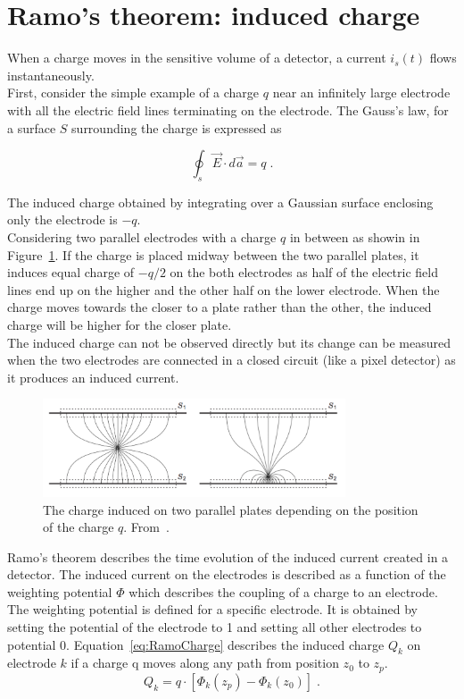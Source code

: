 \section{Ramo's theorem: induced charge}
When a charge moves in the sensitive volume of a detector, a current
$i_s(t)$ flows instantaneously. \\ 
First, consider the simple example of a charge $q$ near an infinitely
large electrode with all the electric field lines terminating on the
electrode. The Gauss's law, for a surface $S$ surrounding the charge
is expressed as

\begin{equation}
\oint_{s} \vec{E} \cdot d\vec{a}=q\; .
\label{eq:GaussLaw}
\end{equation}

The induced charge obtained by integrating over a Gaussian surface
enclosing only the electrode is $-q$. \\
Considering two parallel electrodes with a charge $q$ in between as
showin in Figure~\ref{fig:InducedCharge_parallelPlates}. If the charge
is placed midway between the two parallel plates, it induces equal
charge of $-q/2$ on the both electrodes as half of the electric field
lines end up on the higher and the other half on the lower
electrode. When the charge moves towards the closer to a plate rather
than the other, the induced charge will be higher for the closer
plate. \\
The induced charge can not be observed directly but its change can be
measured when the two electrodes are connected in a closed circuit
(like a pixel detector) as it produces an induced current.

\begin{figure}[htbp]
  \centering
  \includegraphics[width=0.8\textwidth]{figures/Ramo/InducedCharge_parallelPlates.png}
  \caption{The charge induced on two parallel plates depending on the
    position of the charge $q$. From~\cite{Spieler2005}.}
  \label{fig:InducedCharge_parallelPlates}
\end{figure}

Ramo's theorem describes the time evolution of the induced current
created in a detector. The induced current on the electrodes is
described as a function of the weighting potential $\Phi$ which
describes the coupling of a charge to an electrode. \\
The weighting potential is defined for a specific electrode. It is
obtained by setting the potential of the electrode to 1 and setting
all other electrodes to potential 0. Equation~\ref{eq:RamoCharge}
describes the induced charge $Q_k$ on electrode $k$ if a charge q moves along
any path from position $z_0$ to $z_p$.
\begin{equation}
    Q_{k}=q \cdot [\Phi_k(z_p)-\Phi_k(z_0)] \; .
   \label{eq:RamoCharge} 
  \end{equation}

